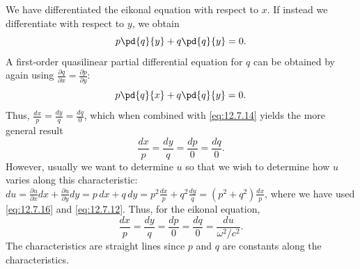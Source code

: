 We have differentiated the eikonal equation with respect to $x$.  If instead we differentiate with respect to $y$, we obtain
\[
p\pd{q}{y} + q\pd{q}{y} = 0.
\]
A first-order quasilinear partial differential equation for $q$ can be obtained by again using $\frac{\partial q}{\partial x} = \frac{\partial p}{\partial y}$:
\begin{equation}
\label{eq:12.7.15}
p\pd{q}{x} + q\pd{q}{y} = 0.
\end{equation}
Thus, $\frac{dx}{p} = \frac{dy}{q} = \frac{dq}{0}$, which when combined with \eqref{eq:12.7.14} yields the more general result
\begin{equation}
\label{eq:12.7.16}
\frac{dx}{p} = \frac{dy}{q} = \frac{dp}{0} = \frac{dq}{0}.
\end{equation}
However, usually we want to determine $u$ so that we wish to determine how $u$ varies along this characteristic: $du = \frac{\partial u}{\partial x}dx + \frac{\partial u}{\partial y}dy = p\,dx + q\,dy = p^2\frac{dx}{p} + q^2\frac{dy}{q} = (p^2 + q^2)\frac{dx}{p}$, where we have used \eqref{eq:12.7.16} and \eqref{eq:12.7.12}.  Thus, for the eikonal equation,
\begin{equation}
\label{eq:12.7.17}
\frac{dx}{p} = \frac{dy}{q} = \frac{dp}{0} = \frac{dq}{0} = \frac{du}{\omega^2/c^2}.
\end{equation}
The characteristics are straight lines since $p$ and $q$ are constants along the characteristics.

